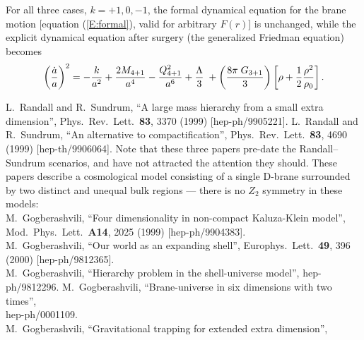 \documentclass[a4paper,12pt]{article}
\begin{document}
For all three cases, $k=+1,0,-1$, the formal dynamical equation for
the brane motion [equation (\ref{E:formal}), valid for arbitrary
$F(r)$] is unchanged, while the explicit dynamical equation after
{\RNdS} surgery (the generalized Friedman equation) becomes
%
\begin{equation}
\left({\dot a \over a}\right)^2 = 
- {k\over a^2} 
+ {2M_{4+1}\over a^4} 
-  {Q_{4+1}^2\over a^6} 
+ {\Lambda\over 3}\;
+\left({ 8\pi \; G_{3+1}\over3}\right) 
\left[\rho + {1\over2} {\rho^2\over\rho_0} \right]. 
\end{equation}
%




\clearpage
\begin{thebibliography}{99}
L.~Randall and R.~Sundrum,
``A large mass hierarchy from a small extra dimension'',
Phys.\ Rev.\ Lett.\  {\bf 83}, 3370 (1999)
[hep-ph/9905221].
L.~Randall and R.~Sundrum,
``An alternative to compactification'',
Phys.\ Rev.\ Lett.\  {\bf 83}, 4690 (1999)
[hep-th/9906064].
Note that these three papers pre-date the Randall--Sundrum scenarios,
and have not attracted the attention they should. These papers
describe a cosmological model consisting of a single D-brane
surrounded by two distinct and unequal bulk regions --- there is no
$Z_2$ symmetry in these models:
\\
M.~Gogberashvili,
``Four dimensionality in non-compact Kaluza-Klein model'',
Mod.\ Phys.\ Lett.\  {\bf A14}, 2025 (1999)
[hep-ph/9904383].
\\
M.~Gogberashvili,
``Our world as an expanding shell'',
Europhys.\ Lett.\  {\bf 49}, 396 (2000)
[hep-ph/9812365].
\\
M.~Gogberashvili,
``Hierarchy problem in the shell-universe model'',
hep-ph/9812296.
M.~Gogberashvili,
``Brane-universe in six dimensions with two times'',\\
hep-ph/0001109.
\\
M.~Gogberashvili,
``Gravitational trapping for extended extra dimension'',\\

\end{thebibliography}
\end{document}
